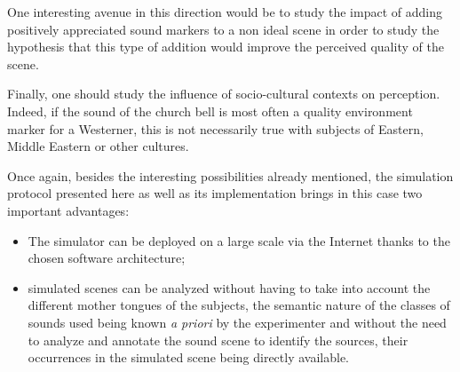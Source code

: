 \documentclass[twoside,twocolumn]{article}
\begin{document}

One interesting avenue in this direction would be to study the impact of adding positively appreciated sound markers to a non ideal scene in order to study the hypothesis that this type of addition would improve the perceived quality of the scene.


Finally, one should study the influence of socio-cultural contexts on perception. Indeed, if the sound of the church bell is most often a quality environment marker for a Westerner, this is not necessarily true with subjects of Eastern, Middle Eastern or other cultures.


Once again, besides the interesting possibilities already mentioned, the simulation protocol presented here as well as its implementation brings in this case two important advantages:


\begin{itemize}
\item The simulator can be deployed on a large scale via the Internet thanks to the chosen software architecture;
\item simulated scenes can be analyzed without having to take into account the different mother tongues of the subjects, the semantic nature of the classes of sounds used being known \emph{a priori} by the experimenter and without the need to analyze and annotate the sound scene to identify the sources, their occurrences in the simulated scene being directly available.
\end{itemize}
\end{document}
